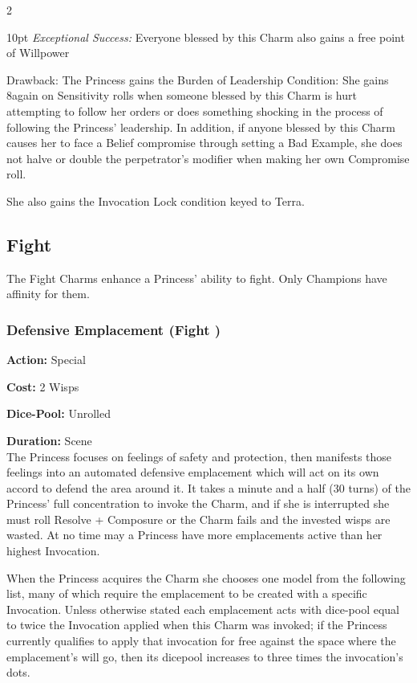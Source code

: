 \begin{multicols}{2}
\begin{myindentpar}{10pt}
    \emph{Exceptional Success:} Everyone blessed by this Charm also gains a free point of Willpower\end{myindentpar}

\noindent Drawback: The Princess gains the Burden of Leadership Condition: She gains 8again on Sensitivity rolls when someone blessed by this Charm is hurt attempting to follow her orders or does something shocking in the process of following the Princess' leadership. In addition, if anyone blessed by this Charm causes her to face a Belief compromise through setting a Bad Example, she does not halve or double the perpetrator's modifier when making her own Compromise roll.

She also gains the Invocation Lock condition keyed to Terra. 

\subsection*{Fight}
\label{subsec:Fight}
The Fight Charms enhance a Princess' ability to fight. Only Champions have affinity for them.

\subsubsection*{Defensive Emplacement (Fight \textbullet)}

\noindent \textbf{Action:} Special

\noindent \textbf{Cost:} 2 Wisps

\noindent \textbf{Dice-Pool:} Unrolled

\noindent \textbf{Duration:} Scene\\

The Princess focuses on feelings of safety and protection, then manifests those feelings into an automated defensive emplacement which will act on its own accord to defend the area around it. It takes a minute and a half (30 turns) of the Princess' full concentration to invoke the Charm, and if she is interrupted she must roll Resolve + Composure or the Charm fails and the invested wisps are wasted. At no time may a Princess have more emplacements active than her highest Invocation.

When the Princess acquires the Charm she chooses one model from the following list, many of which require the emplacement to be created with a specific Invocation. Unless otherwise stated each emplacement acts with dice-pool equal to twice the Invocation applied when this Charm was invoked; if the Princess currently qualifies to apply that invocation for free against the space where the emplacement's will go, then its dicepool increases to three times the invocation's dots. 


\end{multicols}
